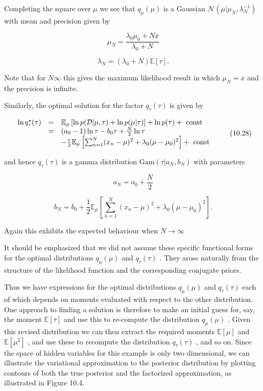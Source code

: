 \documentclass[
  10
]{article}
\begin{document}
Completing the square over \(\mu\) we see that \(q _ { \mu } ( \mu )\)
is a Gaussian
\(\mathcal { N } \left( \mu \vert \mu _ { N } , \lambda _ { N } ^ { - 1 } \right)\)
with mean and precision given by

\[
\mu_ {N} = \frac {\lambda_ {0} \mu_ {0} + N \overline {{x}}}{\lambda_ {0} + N}\tag{10.26}
\]

\[
\lambda_ {N} = (\lambda_ {0} + N) \mathbb {E} [ \tau ].\tag{10.27}
\]

Note that for \(N  \infty\) this gives the maximum likelihood result in
which \(\mu _ { N } = \overline { { x } }\) and the precision is
infinite.

Similarly, the optimal solution for the factor \(q _ { \tau } ( \tau )\)
is given by

\[
\begin{array}{r c l} \ln q _ {\tau} ^ {\star} (\tau) & = & \mathbb {E} _ {\mu} \left[ \ln p (\mathcal {D} | \mu , \tau) + \ln p (\mu | \tau) \right] + \ln p (\tau) + \text { const } \\ & = & (a _ {0} - 1) \ln \tau - b _ {0} \tau + \frac {N}{2} \ln \tau \\ & & - \frac {\tau}{2} \mathbb {E} _ {\mu} \left[ \sum_ {n = 1} ^ {N} (x _ {n} - \mu) ^ {2} + \lambda_ {0} (\mu - \mu_ {0}) ^ {2} \right] + \text { const } \end{array}\tag{10.28}
\]

and hence \(q _ { \tau } ( \tau )\) is a gamma distribution
\({ \mathrm { G a m } } ( \tau | a _ { N } , b _ { N } )\) with
parameters

\[
a _ {N} = a _ {0} + \frac {N}{2}\tag{10.29}
\]

\[
{b _ {N}} = {b _ {0} + \frac {1}{2} \mathbb {E} _ {\mu} \left[ \sum_ {n = 1} ^ {N} (x _ {n} - \mu) ^ {2} + \lambda_ {0} (\mu - \mu_ {0}) ^ {2} \right].}\tag{10.30}
\]

Again this exhibits the expected behaviour when \(N \to \infty\)

It should be emphasized that we did not assume these specific functional
forms for the optimal distributions \(q _ { \mu } ( \mu )\) and
\(q _ { \tau } ( \tau )\) . They arose naturally from the structure of
the likelihood function and the corresponding conjugate priors.

Thus we have expressions for the optimal distributions
\(q _ { \mu } ( \mu )\) and \(q _ { \tau } ( \tau )\) each of which
depends on moments evaluated with respect to the other distribution. One
approach to finding a solution is therefore to make an initial guess
for, say, the moment \(\mathbb { E } [ \tau ]\) and use this to
re-compute the distribution \(q _ { \mu } ( \mu )\) . Given this revised
distribution we can then extract the required moments
\(\mathbb { E } [ \mu ]\) and \(\mathbb { E } [ \mu ^ { 2 } ]\) , and
use these to recompute the distribution \(q _ { \tau } ( \tau )\) , and
so on. Since the space of hidden variables for this example is only two
dimensional, we can illustrate the variational approximation to the
posterior distribution by plotting contours of both the true posterior
and the factorized approximation, as illustrated in Figure 10.4.
\end{document}
